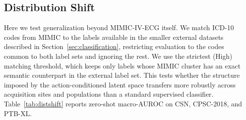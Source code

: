 \subsection{Distribution Shift}
\label{sec:distshift}

Here we test generalization beyond MIMIC-IV-ECG itself. We match ICD-10 codes from MIMIC to the labels available in the smaller external datasets described in Section~\ref{sec:classification}, restricting evaluation to the codes common to both label sets and ignoring the rest. We use the strictest (High) matching threshold, which keeps only labels whose MIMIC cluster has an exact semantic counterpart in the external label set. 
This tests whether the structure imposed by the action-conditioned latent space transfers more robustly across acquisition sites and populations than a standard supervised classifier. Table~\ref{tab:distshift} reports zero-shot macro-AUROC on CSN, CPSC-2018, and PTB-XL.

\begin{table}[t]
\caption{Zero-shot Distribution Shift macro-AUROC, Section~\ref{sec:distshift}. All methods are pretrained/finetuned on MIMIC-IV-ECG only and transferred without further training, under the High ICD-10 label-matching threshold. CSN = Chapman--Shaoxing--Ningbo. 95\% CIs are from bootstrap resampling.}
\label{tab:distshift}
\centering
{}
\end{table}

